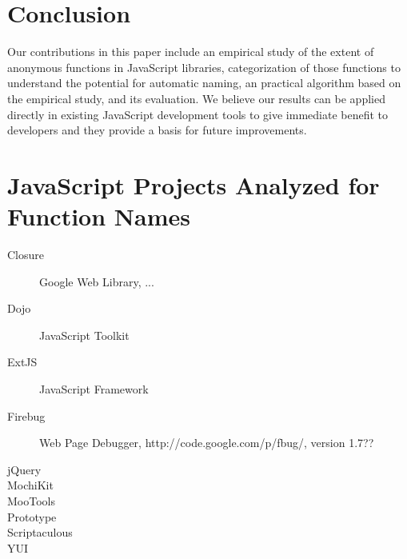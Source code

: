 \documentclass[10pt, preprint]{sigplanconf}
\begin{document}

\section{Conclusion}
Our contributions in this paper include an empirical study of the extent of anonymous functions in JavaScript libraries, categorization of those functions to understand the potential for automatic naming, an practical algorithm based on the empirical study, and its evaluation.   We believe our results can be applied directly in existing JavaScript development tools to give immediate benefit to developers and they provide a basis for future improvements.



\appendix
\section{JavaScript Projects Analyzed for Function Names}
\begin{description}
\item[Closure] Google Web Library, ...
\item[Dojo] JavaScript Toolkit
\item[ExtJS] JavaScript Framework
\item[Firebug] Web Page Debugger, http://code.google.com/p/fbug/, version 1.7??
\item[jQuery]
\item[MochiKit]
\item[MooTools]
\item[Prototype]
\item[Scriptaculous]
\item[YUI]
\end{description}



\end{document}
